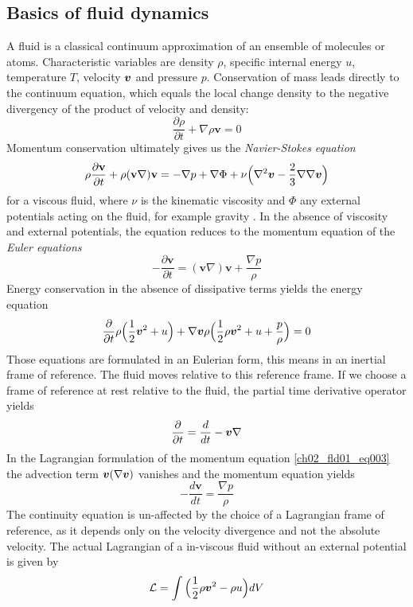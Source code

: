 \subsection{Basics of fluid dynamics}
A fluid is a classical continuum approximation of an ensemble of molecules or atoms. Characteristic variables are density $\rho$, specific internal energy $u$, temperature $T$, velocity $\boldsymbol{v}$ and pressure $p$. Conservation of mass leads directly to the continuum equation, which equals the local change density to the negative divergency of the product of velocity and density:
\begin{equation}
\label{ch02_fld01_eq001}
\frac{\partial \rho}{\partial t} +    \nabla \rho \mathbf{v} = 0
\end{equation}
Momentum conservation ultimately gives us the \emph{Navier-Stokes equation} 
\begin{equation}
\label{ch02_fld01_eq002}
\rho \frac{\partial \mathbf{v}}{\partial t} + \rho ( \mathbf{v} \nabla ) \mathbf{v} = - \nabla p + \nabla \Phi + \nu \Big( \nabla^2 \boldsymbol{v} - \frac{2}{3} \nabla \nabla \boldsymbol{v} \Big)
\end{equation}
for a viscous fluid, where $\nu$ is the kinematic viscosity and $\Phi$ any external potentials acting on the fluid, for example gravity \citep{shore2007astrophysical}. In the absence of viscosity and external potentials, the equation reduces  to the momentum equation of the \emph{Euler equations}
\begin{equation}
\label{ch02_fld01_eq003}
- \frac{\partial \mathbf{v}}{\partial t} =  ( \mathbf{v} \nabla ) \mathbf{v} + \frac{\nabla p}{\rho}
\end{equation}
Energy conservation in the absence of dissipative terms yields the energy equation
\begin{equation}
\label{ch02_fld01_eq003a}
\frac{\partial}{\partial t} \rho \Big( \frac{1}{2} \boldsymbol{v}^2 + u \Big) + \nabla \boldsymbol{v} \rho \Big( \frac{1}{2} \rho \boldsymbol{v}^2 + u + \frac{p}{\rho} \Big) = 0
\end{equation}
Those equations are formulated in an Eulerian form, this means in an inertial frame of reference. The fluid moves relative to this reference frame. If we choose a frame of reference at rest relative to the fluid, the partial time derivative operator  yields
\begin{equation}
\label{ch02_fld01_eq003c}
\frac{\partial}{\partial t} = \frac{d}{dt} - \boldsymbol{v} \nabla
\end{equation}
In the Lagrangian formulation of the momentum equation  \ref{ch02_fld01_eq003} the advection term $\boldsymbol{v} (\nabla \boldsymbol{v})$ vanishes and the momentum equation yields
\begin{equation}
\label{ch02_fld01_eq003b}
- \frac{d \mathbf{v}}{d t} = \frac{\nabla p}{\rho}
\end{equation}
The continuity equation is un-affected by the choice of a Lagrangian frame of reference, as it depends only on the velocity divergence and not the absolute velocity. The actual Lagrangian of a in-viscous fluid without an external potential is given by
\begin{equation}
\label{ch02_fld01_eq004}
\mathcal{L} = \int \Big( \frac{1}{2} \rho \boldsymbol{v} ^2 - \rho u \Big) dV
\end{equation}

